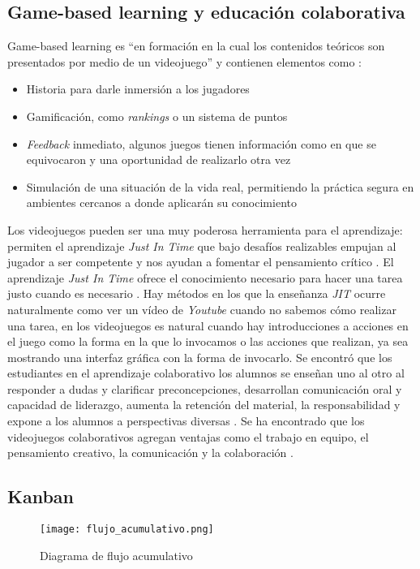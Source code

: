 \subsection{Game-based learning y educación colaborativa}
Game-based learning es “en formación en la cual los contenidos teóricos son presentados por medio de un videojuego” \cite{gamelearn2014a} y contienen elementos como \cite{gamelearn2017a}:
\begin{itemize}
    \item Historia para darle inmersión a los jugadores
    \item Gamificación, como \textit{rankings} o un sistema de puntos
    \item \textit{Feedback} inmediato, algunos juegos tienen información como en que se equivocaron y una oportunidad de realizarlo otra vez
    \item Simulación de una situación de la vida real, permitiendo la práctica segura en ambientes cercanos a donde aplicarán su conocimiento
\end{itemize}

Los videojuegos pueden ser una muy poderosa herramienta para el aprendizaje: permiten el aprendizaje \textit{Just In Time} que bajo desafíos realizables empujan al 
jugador a ser competente y nos ayudan a fomentar el pensamiento crítico \cite{levasseur-a}. 
El aprendizaje \textit{Just In Time} ofrece el conocimiento necesario para hacer una tarea justo cuando es necesario \cite{unknown2017a}. 
Hay métodos en los que la enseñanza \textit{JIT} ocurre naturalmente como ver un vídeo de \textit{Youtube} cuando no sabemos cómo realizar una tarea, 
en los videojuegos es natural cuando hay introducciones a acciones en el juego como la forma en la que lo invocamos o las acciones que realizan, 
ya sea mostrando una interfaz gráfica con la forma de invocarlo.
Se encontró que los estudiantes en el aprendizaje colaborativo los alumnos se enseñan uno al otro al responder a dudas y 
clarificar preconcepciones, desarrollan comunicación oral y capacidad de liderazgo, aumenta la retención del material, 
la responsabilidad y expone a los alumnos a perspectivas diversas \cite{university-a}.
Se ha encontrado que los videojuegos colaborativos agregan ventajas como el trabajo en equipo, el pensamiento creativo, 
la comunicación y la colaboración \cite{romano-a}.

\subsection{Kanban}
\begin{figure}[h!]
    \centering
    \texttt{[image: flujo\_acumulativo.png]}
        \caption{Diagrama de flujo acumulativo}
    \label{fig:flujo_acumulativo}
\end{figure}


